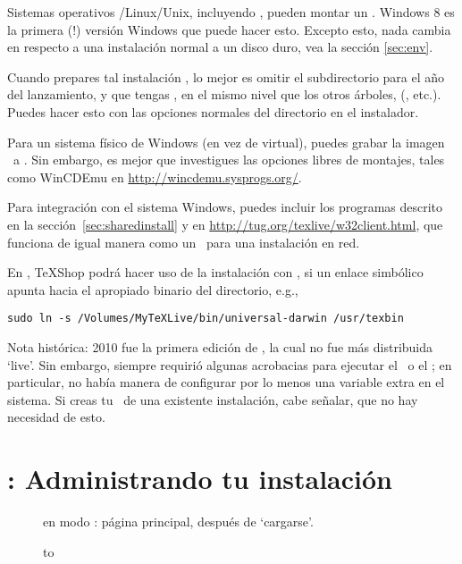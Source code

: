 \documentclass{article}
\begin{document}
Sistemas operativos \GNU/Linux/Unix, incluyendo \MacOSX, pueden montar
un \ISO. Windows 8 es la primera (!) versión Windows que puede hacer
esto. Excepto esto, nada cambia en respecto a una instalación normal a
un disco duro, vea la sección \ref{sec:env}.

Cuando prepares tal instalación \ISO, lo mejor es omitir el
subdirectorio para el año del lanzamiento, y que tengas
, en el mismo nivel que los otros árboles,
(, etc.). Puedes hacer esto con las opciones
normales del directorio en el instalador.

Para un sistema físico de Windows (en vez de virtual), puedes grabar
la imagen \ISO\ a . Sin embargo, es mejor que investigues
las opciones libres de montajes\Dash\ISO, tales como WinCDEmu en 
\url{http://wincdemu.sysprogs.org/}.

Para integración con el sistema Windows, puedes incluir los programas
 descrito en la sección~\ref{sec:sharedinstall} y
en \url{http://tug.org/texlive/w32client.html}, que funciona de igual
manera como un \ISO\ para una instalación en red. 

En \MacOSX, TeXShop podrá hacer uso de la instalación con , 
si un enlace simbólico  apunta hacia el
apropiado binario del directorio, e.g., 
\begin{verbatim}
sudo ln -s /Volumes/MyTeXLive/bin/universal-darwin /usr/texbin
\end{verbatim}

Nota histórica: \TL{} 2010 fue la primera edición de \TL{}, la cual no
fue más distribuida `live'. Sin embargo, siempre requirió algunas
acrobacias para ejecutar el \DVD\ o el \ISO; en particular, no había
manera de configurar por lo menos una variable extra en el sistema. Si
creas tu \ISO\ de una existente instalación, cabe señalar, que no hay necesidad de esto.

\section{: Administrando tu instalación}
\label{sec:tlmgr}

\begin{figure}[tb]
\caption{ en modo \GUI: página principal, después de
`cargarse'.}
\label{fig:tlmgr-gui}
\end{figure}

\begin{figure}[tb]
\hbox to 
\end{figure} 
\end{document}
